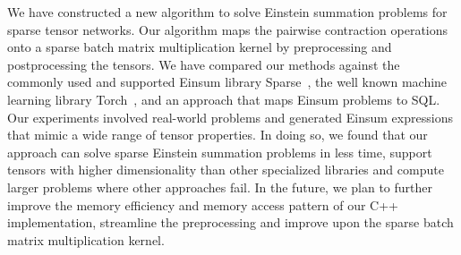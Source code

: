 We have constructed a new algorithm to solve Einstein summation problems for sparse tensor networks.
Our algorithm maps the pairwise contraction operations onto a sparse batch matrix multiplication kernel
by preprocessing and postprocessing the tensors. We have compared our methods against the commonly used
and supported Einsum library Sparse~\cite{sparse}, the well known machine learning library
Torch~\cite{pytorch}, and an approach that maps Einsum problems to SQL. Our experiments involved
real-world problems and generated Einsum expressions that mimic a wide range of tensor properties.
In doing so, we found that our approach can solve sparse Einstein summation problems in less time,
support tensors with higher dimensionality than other specialized libraries and compute larger problems
where other approaches fail. In the future, we plan to further improve the memory efficiency and
memory access pattern of our C++ implementation, streamline the preprocessing and improve upon the
sparse batch matrix multiplication kernel.